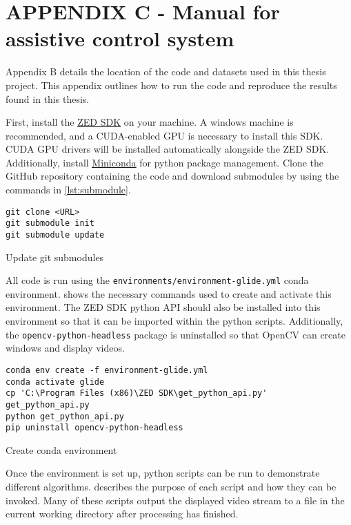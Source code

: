 \section*{APPENDIX C - Manual for assistive control system}

Appendix B details the location of the code and datasets used in this thesis project.
This appendix outlines how to run the code and reproduce the results found in this thesis.

First, install the \href{https://www.stereolabs.com/developers/release/}{\underline{ZED SDK}} on your machine.
A windows machine is recommended, and a CUDA-enabled GPU is necessary to install this SDK.
CUDA GPU drivers will be installed automatically alongside the ZED SDK.
Additionally, install \href{https://conda.io/miniconda.html}{\underline{Miniconda}} for python package management.
Clone the GitHub repository containing the code and download submodules by using the commands in \cref{lst:submodule}.

\begin{listing}[H]
\begin{verbatim}
git clone <URL>
git submodule init
git submodule update
\end{verbatim}
\caption{Update git submodules}
\label{lst:submodule}
\end{listing}

All code is run using the \texttt{environments/environment-glide.yml} conda environment.  shows the necessary commands
used to create and activate this environment. The ZED SDK python API should also be installed into this environment so that
it can be imported within the python scripts. Additionally, the \texttt{opencv-python-headless} package is uninstalled so
that OpenCV can create windows and display videos.

\begin{listing}[H]
\begin{verbatim}
conda env create -f environment-glide.yml
conda activate glide
cp 'C:\Program Files (x86)\ZED SDK\get_python_api.py' get_python_api.py
python get_python_api.py
pip uninstall opencv-python-headless
\end{verbatim}
\caption{Create conda environment}
\label{lst:conda}
\end{listing}

Once the environment is set up, python scripts can be run to demonstrate different algorithms.
 describes the purpose of each script and how they can be invoked.
Many of these scripts output the displayed video stream to a file in the current working directory
after processing has finished.

